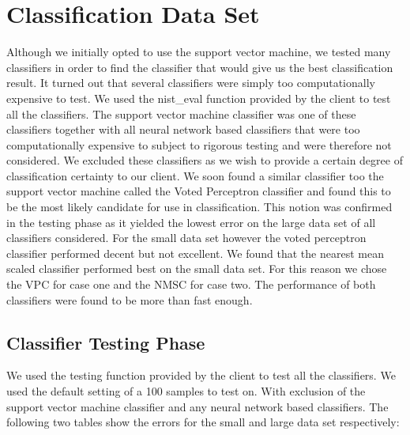 \documentclass[%
        compressed,
        final,
        notitlepage,
        narroweqnarray,
        inline,
        twoside,
        ]{ieee}
\begin{document}
\section{Classification Data Set}
Although we initially opted to use the support vector machine, we tested many
classifiers in order to find the classifier that would give us the best
classification result. It turned out that several classifiers were simply too
computationally expensive to test. We used the nist\_eval function provided
by the client to test all the classifiers. The support vector machine classifier
was one of these classifiers together with all neural network based classifiers
that were too computationally expensive to subject to rigorous testing and were
therefore not considered. We excluded these classifiers as we wish to provide a
certain degree of classification certainty to our client. We soon found a
similar classifier too the support vector machine called the Voted Perceptron classifier and found this to be
the most likely candidate for use in classification. This notion was confirmed in the testing phase as it
yielded the lowest error on the large data set of all classifiers considered.
For the small data set however the voted perceptron classifier performed decent
but not excellent. We found that the nearest mean scaled classifier performed
best on the small data set. For this reason we chose the VPC for case one and
the NMSC for case two. The performance of both classifiers were found to be more
than fast enough.

\subsection{Classifier Testing Phase}
We used the testing function provided by the client to test all the classifiers.
We used the default setting of a 100 samples to test on. With exclusion of the
support vector machine classifier and any neural network based classifiers. The
following two tables show the errors for the small and large data set
respectively:
\end{document}
